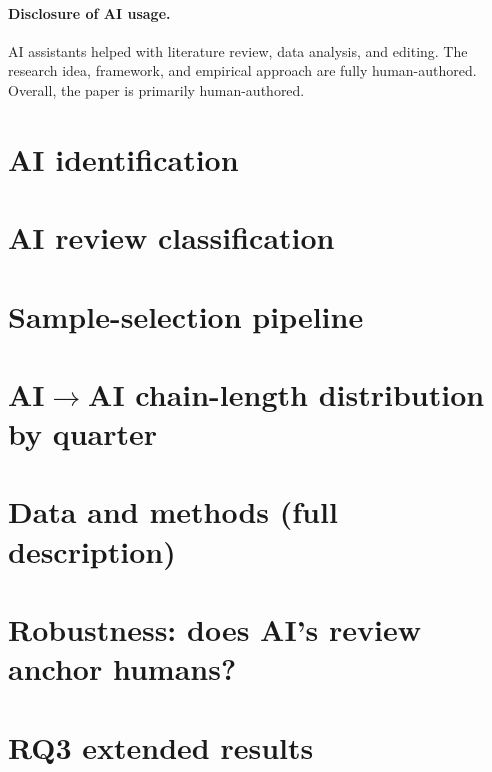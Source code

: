 \documentclass{article}
\begin{document}
\paragraph{Disclosure of AI usage.} AI assistants helped with literature review, data analysis, and editing. The research idea, framework, and empirical approach are fully human-authored. Overall, the paper is primarily human-authored.




\newpage\appendix
\onecolumn
\section{AI identification}
\label{app:allowlist}


\section{AI review classification}
\label{app:ai-verdict-regex}


\section{Sample-selection pipeline}
\label{app:repo-selection}


\section{AI$\to$AI chain-length distribution by quarter}
\label{app:extra-figures}


\section{Data and methods (full description)}
\label{app:methods}


\section{Robustness: does AI's review anchor humans?}
\label{app:anchoring}


\section{RQ3 extended results}
\label{app:quarterly-did}

\end{document}
